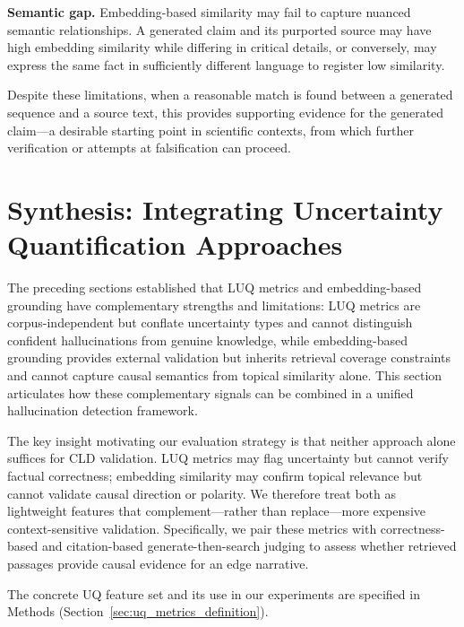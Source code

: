 \noindent\textbf{Semantic gap.} Embedding-based similarity may fail to capture nuanced semantic relationships. A generated claim and its purported source may have high embedding similarity while differing in critical details, or conversely, may express the same fact in sufficiently different language to register low similarity.

\noindent Despite these limitations, when a reasonable match is found between a generated sequence and a source text, this provides supporting evidence for the generated claim---a desirable starting point in scientific contexts, from which further verification or attempts at falsification can proceed.

\section{Synthesis: Integrating Uncertainty Quantification Approaches}
\label{sec:uq_design_rationale}

The preceding sections established that LUQ metrics and embedding-based grounding have complementary strengths and limitations: LUQ metrics are corpus-independent but conflate uncertainty types and cannot distinguish confident hallucinations from genuine knowledge, while embedding-based grounding provides external validation but inherits retrieval coverage constraints and cannot capture causal semantics from topical similarity alone. This section articulates how these complementary signals can be combined in a unified hallucination detection framework.

The key insight motivating our evaluation strategy is that neither approach alone suffices for CLD validation. LUQ metrics may flag uncertainty but cannot verify factual correctness; embedding similarity may confirm topical relevance but cannot validate causal direction or polarity. We therefore treat both as lightweight features that complement---rather than replace---more expensive context-sensitive validation. Specifically, we pair these metrics with correctness-based and citation-based generate-then-search judging to assess whether retrieved passages provide causal evidence for an edge narrative.

\noindent The concrete UQ feature set and its use in our experiments are specified in Methods (Section~\ref{sec:uq_metrics_definition}).
